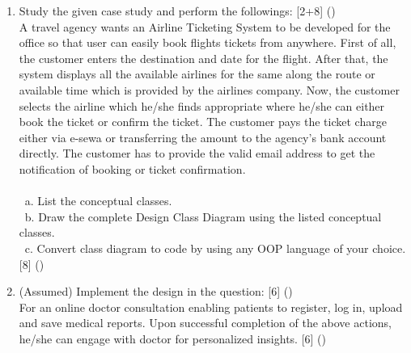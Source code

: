 \documentclass[12pt]{article}
\newcommand{\enter}{\\\textcolor{white}{1}}
\begin{document}
\begin{enumerate}
      \item Study the given case study and perform the followings: \hfill [2+8] ()\\
        A travel agency wants an Airline Ticketing System to be developed for the office so that user can easily book flights tickets from anywhere. First of all, the customer enters the destination and date for the flight. After that, the system displays all the available airlines for the same along the route or available time which is provided by the airlines company. Now, the customer selects the airline which he/she finds appropriate where he/she can either book the ticket or confirm the ticket. The customer pays the ticket charge either via e-sewa or transferring the amount to the agency's bank account directly. The customer has to provide the valid email address to get the notification of booking or ticket confirmation.\\
        \enter a. List the conceptual classes.
        \enter b. Draw the complete Design Class Diagram using the listed conceptual classes. 
        \enter c. Convert class diagram to code by using any OOP language of your choice. \hfill [8] ()

      \item (Assumed) Implement the design in the question: \hfill [6] ()\\
        For an online doctor consultation enabling patients to register, log in, upload and save medical reports. Upon successful completion of the above actions, he/she can engage with doctor for personalized insights. \hfill [6] ()


\end{enumerate}
\end{document}
